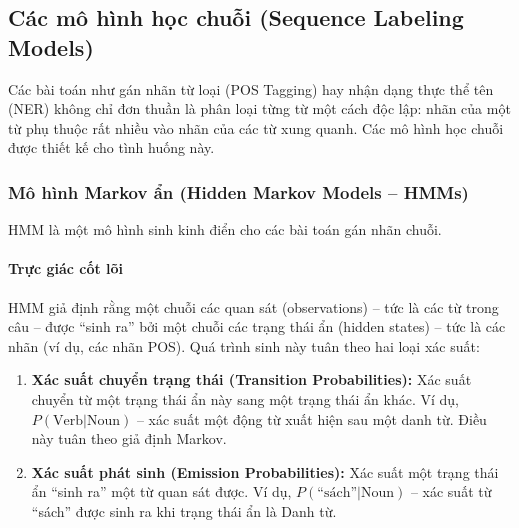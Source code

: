 \subsection{Các mô hình học chuỗi (Sequence Labeling Models)}
\label{ssec:sequence_models}
Các bài toán như gán nhãn từ loại (POS Tagging) hay nhận dạng thực thể tên (NER) không chỉ đơn thuần là phân loại từng từ một cách độc lập: nhãn của một từ phụ thuộc rất nhiều vào nhãn của các từ xung quanh. Các mô hình học chuỗi được thiết kế cho tình huống này.

\subsubsection{Mô hình Markov ẩn (Hidden Markov Models -- HMMs)}
HMM \cite{rabiner1989tutorial} là một mô hình sinh kinh điển cho các bài toán gán nhãn chuỗi.

\paragraph{Trực giác cốt lõi}
HMM giả định rằng một chuỗi các quan sát (observations) -- tức là các từ trong câu -- được “sinh ra” bởi một chuỗi các trạng thái ẩn (hidden states) -- tức là các nhãn (ví dụ, các nhãn POS).
Quá trình sinh này tuân theo hai loại xác suất:
\begin{enumerate}
    \item \textbf{Xác suất chuyển trạng thái (Transition Probabilities):} Xác suất chuyển từ một trạng thái ẩn này sang một trạng thái ẩn khác. Ví dụ, $P(\text{Verb}|\text{Noun})$ -- xác suất một động từ xuất hiện sau một danh từ. Điều này tuân theo giả định Markov.
    \item \textbf{Xác suất phát sinh (Emission Probabilities):} Xác suất một trạng thái ẩn “sinh ra” một từ quan sát được. Ví dụ, $P(\text{``sách''}|\text{Noun})$ -- xác suất từ “sách” được sinh ra khi trạng thái ẩn là Danh từ.
\end{enumerate}

\begin{center}
    \label{fig:hmm_diagram}
\end{center}

